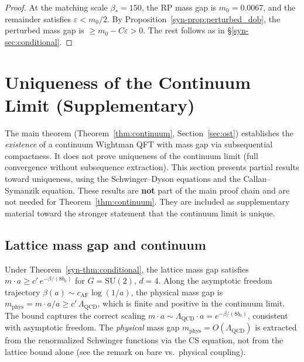 \documentclass[11pt]{article}
\theoremstyle{definition}
\newcommand{\SU}{\mathrm{SU}}
\begin{document}
\begin{proof}
At the matching scale $\beta_* = 150$, the RP mass gap
is $m_0 = 0.0067$, and the remainder satisfies
$\varepsilon < m_0/2$.  By Proposition~\ref{syn-prop:perturbed_dob},
the perturbed mass gap is $\geq m_0 - C\varepsilon > 0$.
The rest follows as in \S\ref{syn-sec:conditional}.
\end{proof}



\section{Uniqueness of the Continuum Limit
(Supplementary)}\label{syn-sec:continuum}

The main theorem (Theorem~\ref{thm:continuum},
Section~\ref{sec:ost}) establishes the \emph{existence} of a
continuum Wightman QFT with mass gap via subsequential
compactness.  It does not prove uniqueness of the continuum
limit (full convergence without subsequence extraction).
This section presents partial results toward uniqueness,
using the Schwinger--Dyson equations and the Callan--Symanzik
equation.  These results are \textbf{not} part of the main
proof chain and are not needed for Theorem~\ref{thm:continuum}.
They are included as supplementary material
toward the stronger statement that the continuum limit is unique.

\subsection{Lattice mass gap and continuum}

Under Theorem~\ref{syn-thm:conditional}, the lattice mass gap
satisfies $m \cdot a \geq c'\,e^{-\beta/(8b_0)}$ for
$G = \SU(2)$, $d = 4$.
Along the asymptotic freedom trajectory
$\beta(a) \sim c_{\mathrm{AF}} \log(1/a)$, the
physical mass gap is
$m_{\mathrm{phys}} = m \cdot a / a
\geq c'\,\Lambda_{\mathrm{QCD}}$,
which is finite and positive in the continuum limit.
The bound captures the correct scaling
$m \cdot a \sim \Lambda_{\mathrm{QCD}} \cdot a
= e^{-\beta/(8b_0)}$,
consistent with asymptotic freedom.
The \emph{physical} mass gap
$m_{\mathrm{phys}} = O(\Lambda_{\mathrm{QCD}})$
is extracted from the renormalized
Schwinger functions via the CS equation, not from
the lattice bound alone (see the remark on bare vs.\ physical coupling).
\end{document}
